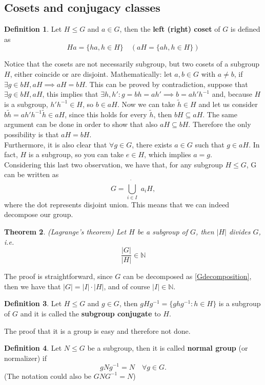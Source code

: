 \documentclass[12pt]{book}
\theoremstyle{plain}
\newtheorem{thm}{Theorem}[section]
\theoremstyle{definition}
\newtheorem{dfn}[thm]{Definition}
\theoremstyle{remark}
\begin{document}
\subsection{Cosets and conjugacy classes}
\begin{dfn}
Let $H\leq G$ and $a\in G$, then the \textbf{left (right) coset} of $G$ is defined as
\[Ha = \{ha,h\in H\}\quad  (aH = \{ah,h\in H\})\]
\end{dfn}
Notice that the cosets are not necessarily subgroup, but two cosets of a subgroup $H$, either coincide or are disjoint. Mathematically: let $a,b\in G$ with $a\neq b$, if $\exists g\in bH,aH \implies aH = bH$. This can be proved by contradiction, suppose that $\exists g\in bH,aH$, this implies that $\exists h,h':g=bh=ah' \implies b = ah'h^{-1}$ and, because $H$ is a subgroup,
$h'h^{-1}\in H$, so $b\in aH$. Now we can take $\widetilde{h}\in H$ and let us consider $b\widetilde{h} = ah'h^{-1}\widetilde{h} \in aH$, since this holds for every $\widetilde{h}$, then $bH\subseteq aH$. The same argument can be done in order to show that also $aH \subseteq bH$. Therefore the only possibility is that $aH = bH$.\\
Furthermore, it is also clear that $\forall g\in G$, there exists $a\in G$ such that $g\in aH$. In fact, $H$ is a subgroup, so you can take $e\in H$, which implies $a=g$.\\
Considering this last two observation, we have that, for any subgroup $H\leq G$, G can be written as
\begin{equation}\label{Gdecomposition}G = \dot{\bigcup_{i\in I}}\,\, a_i H,\end{equation}
where the dot represents disjoint union. This means that we can indeed decompose our group.
\begin{thm}(Lagrange's theorem)
Let $H$ be a subgroup of $G$, then $|H|$ divides $G$, i.e. 
\[\frac{|G|}{|H|} \in \mathbb{N}\]
\end{thm}
The proof is straightforward, since $G$ can be decomposed as \eqref{Gdecomposition}, then we have that $|G| = |I|\cdot |H|$, and of course $|I|\in \mathbb{N}$.
\begin{dfn}
Let $H\leq G$ and $g\in G$, then $gHg^{-1}= \{ghg^{-1}:h\in H\}$ is a subgroup of $G$ and it is called the \textbf{subgroup conjugate} to $H$.
\end{dfn}
The proof that it is a group is easy and therefore not done. 
\begin{dfn}
Let $N\leq G$ be a subgroup, then it is called \textbf{normal group} (or normalizer) if
\[gNg^{-1} = N \quad \forall g\in G.\]
(The notation could also be $GNG^{-1}=N$)
\end{dfn}
\end{document}
